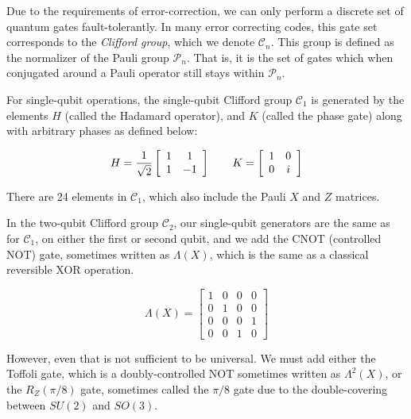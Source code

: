 Due to the requirements of error-correction, we can only perform a discrete
set of
quantum gates fault-tolerantly. In many error correcting codes, this gate
set corresponds to the \emph{Clifford group}, which we denote $\mathcal{C}_n$.
This group is defined as the
normalizer of the Pauli group $\mathcal{P}_n$.
That is, it is the set of gates which
when conjugated around a Pauli operator still stays within $\mathcal{P}_n$.

For single-qubit operations, the single-qubit Clifford group $\mathcal{C}_1$
is generated by the elements $H$ (called the Hadamard operator),
and $K$ (called the phase gate) along with arbitrary phases as defined below:

\begin{equation}
H = \frac{1}{\sqrt{2}}
 \left[
  \begin{array}{cc}
    1 & 1 \\
    1 & -1 \\
  \end{array} \right]
\qquad
K = 
 \left[
  \begin{array}{cc}
    1 & 0 \\
    0 & i \\
  \end{array} \right]
\end{equation}

There are 24 elements in $\mathcal{C}_1$, which also include the Pauli $X$ and
$Z$ matrices.

In the two-qubit Clifford group $\mathcal{C}_2$, our single-qubit
generators are the
same as for $\mathcal{C}_1$, on either the first or second qubit,
and we add the CNOT (controlled NOT) gate, sometimes written as $\Lambda(X)$, which
is the same as a classical reversible XOR operation.

\begin{equation}
\Lambda(X) = 
 \left[
  \begin{array}{cccc}
    1 & 0 & 0 & 0\\
    0 & 1 & 0 & 0\\
    0 & 0 & 0 & 1\\
    0 & 0 & 1 & 0
  \end{array} \right]
\end{equation}

However, even that is not sufficient to be universal. We must add either
the Toffoli gate, which is a doubly-controlled NOT sometimes written as
$\Lambda^2(X)$, or the $R_Z(\pi/8)$ gate, sometimes called the $\pi/8$ gate
due to the double-covering between $SU(2)$ and $SO(3)$.

